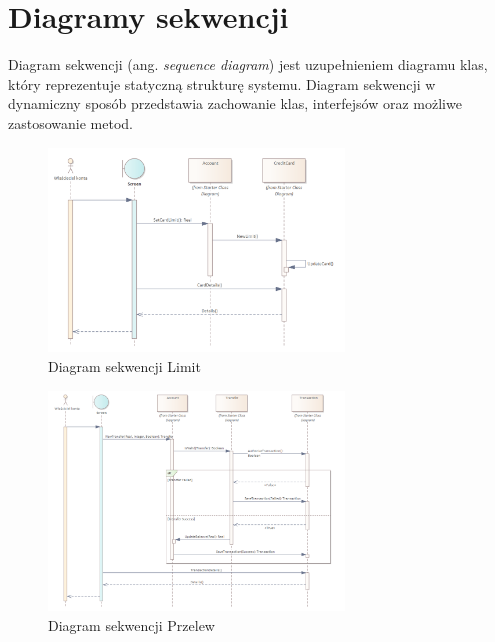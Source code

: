 \section{Diagramy sekwencji}
Diagram sekwencji (ang. \textit{sequence diagram}) jest uzupełnieniem diagramu klas, który reprezentuje statyczną strukturę systemu. Diagram sekwencji w dynamiczny sposób przedstawia zachowanie klas, interfejsów oraz możliwe zastosowanie metod.
\begin{figure}[H]
	\centering
	\includegraphics[width=0.7\textwidth]{images/Limit.png}
	\caption{Diagram sekwencji Limit}
	\label{fig:Seq1}
\end{figure}
\begin{figure}[H]
	\centering
	\includegraphics[width=0.7\textwidth]{images/Przelew.png}
	\caption{Diagram sekwencji Przelew}
	\label{fig:Seq2}
\end{figure}
